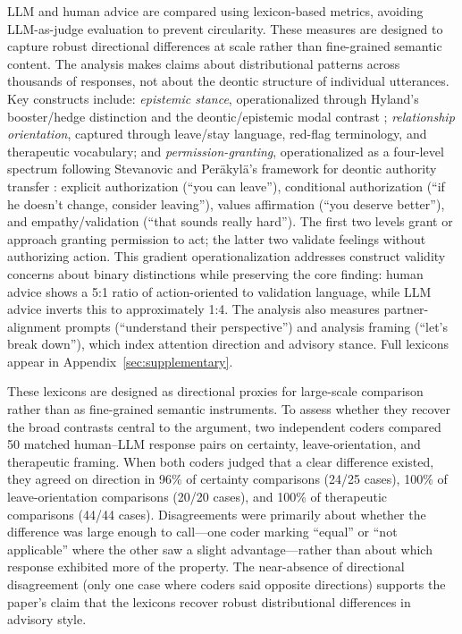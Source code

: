 LLM and human advice are compared using lexicon-based metrics, avoiding LLM-as-judge evaluation to prevent circularity. These measures are designed to capture robust directional differences at scale rather than fine-grained semantic content. The analysis makes claims about distributional patterns across thousands of responses, not about the deontic structure of
individual utterances. Key constructs include: \textit{epistemic stance}, operationalized through Hyland's booster/hedge distinction and the deontic/epistemic modal contrast \citep{hyland1998hedging, palmer2001mood}; \textit{relationship orientation}, captured through leave/stay language, red-flag terminology, and therapeutic vocabulary; and \textit{permission-granting}, operationalized as a four-level spectrum following Stevanovic and Per\"{a}kyl\"{a}'s framework for deontic authority transfer \citep{stevanovic2012deontic}: explicit authorization (``you can leave''), conditional authorization (``if he doesn't change, consider leaving''), values affirmation (``you deserve better''), and empathy/validation (``that sounds really hard''). The first two levels grant or approach granting permission to act; the latter two validate feelings without authorizing action. This gradient operationalization addresses construct validity concerns about binary distinctions while preserving the core finding: human advice shows a 5:1 ratio of action-oriented to validation language, while LLM advice inverts this to approximately 1:4. The analysis also measures partner-alignment prompts (``understand their perspective'') and analysis framing (``let's break down''), which index attention direction and advisory stance. Full lexicons appear in Appendix~\ref{sec:supplementary}.

These lexicons are designed as directional proxies for large-scale comparison rather than as fine-grained semantic instruments. To assess whether they recover the broad contrasts central to the argument, two independent coders compared 50 matched human--LLM response pairs on certainty, leave-orientation, and therapeutic framing. When both coders judged that a clear difference existed, they agreed on direction in 96\% of certainty comparisons (24/25 cases), 100\% of leave-orientation comparisons (20/20 cases), and 100\% of therapeutic comparisons (44/44 cases). Disagreements were primarily about whether the difference was large enough to call---one coder marking ``equal'' or ``not applicable'' where the other saw a slight advantage---rather than about which response exhibited more of the property. The near-absence of directional disagreement (only one case where coders said opposite directions) supports the paper's claim that the lexicons recover robust distributional differences in advisory style.

